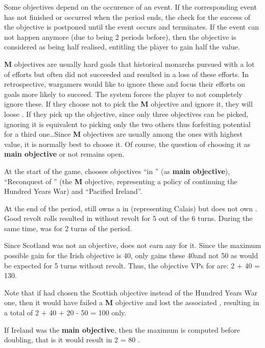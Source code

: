 \bparag Some objectives depend on the occurence of an event.
\bparag If the corresponding event has not finished or occurred when the
period ends, the check for the success of the objective is postponed until the
event occurs and terminates.
\bparag If the event can not happen anymore (due to being 2 periods before),
then the objective is considered as being half realised, entitling the player
to gain half the \VPs value.

\begin{designnote}
  {\bf M} objectives are usually hard goals that historical monarchs pursued
  with a lot of efforts but often did not succeeded and resulted in a loss of
  these efforts. In retrospective, wargamers would like to ignore these and
  focus their efforts on goals more likely to succeed. The system forces the
  player to not completely ignore these. If they choose not to pick the {\bf
    M} objective and ignore it, they will loose \VPs. If they pick up the
  objective, since only three objectives can be picked, ignoring it is
  equivalent to picking only the two others thus forfeiting potential \VPs for
  a third one\ldots Since {\bf M} objectives are usually among the ones with
  highest \VPs value, it is normally best to choose it. Of course, the
  question of choosing it as \textbf{main objective} or not remains open.
\end{designnote}

\begin{exemple}
  At the start of the game, \ANG chooses objectives ``\Presidio in
  \provincePicardie'' (as \textbf{main objective}), ``Reconquest of
  \provinceGuyenne'' (the {\bf M} objective, representing a policy of
  continuing the Hundred Years War) and ``Pacified Ireland''.

  At the end of the period, \ANG still owns a \Presidio in \provincePicardie
  (representing Calais) but does not own \provinceGuyenne. Good revolt rolls
  resulted in \regionIrlande without revolt for 5 out of the 6 turns. During
  the same time, \paysEcosse was \VASSAL for 2 turns of the period.

  Since Scotland was not an objective, \ANG does not earn any \VP for
  it. Since the maximum possible gain for the Irish objective is 40\VPs, \ANG
  only gains these 40\VPs and not 50 as would be expected for 5 turns without
  revolt. Thus, the objective VPs for \ANG are: 2  + 40 =
  130\VPs.

  Note that if \ANG had chosen the Scottish objective instead of the Hundred
  Years War one, then it would have failed a {\bf M} objective and lost the
  associated \VPs, resulting in a total of 2   + 40 + 20 - 50
  = 100 \VPs only.

  If Ireland was the \textbf{main objective}, then the maximum is computed
  before doubling, that is it would result in 2  = 80 \VPs.
\end{exemple}

